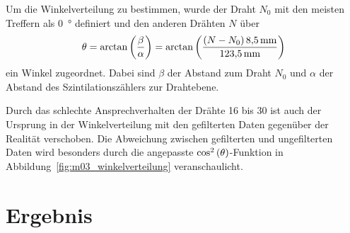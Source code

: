 \documentclass[11pt, ngerman, fleqn, DIV=15, headinclude, BCOR=2cm]{scrreprt}
\begin{document}
Um die Winkelverteilung zu bestimmen, wurde der Draht $N_0$ mit den meisten Treffern
als \SI{0}{\degree} definiert und den anderen Drähten $N$ über
\begin{equation}
	\theta = \arctan{\del{\frac{\beta}{\alpha}}} = \arctan{\del{\frac{\del{N - N_0}
	\SI{8.5}{\milli\metre}}{\SI{123.5}{\milli\metre}}}}
\end{equation}
ein Winkel zugeordnet. Dabei sind $\beta$ der Abstand zum Draht $N_0$ und
$\alpha$ der Abstand des Szintilationszählers zur Drahtebene.

Durch das schlechte Ansprechverhalten der Drähte 16 bis 30 ist auch der
Ursprung in der Winkelverteilung mit den gefilterten Daten gegenüber der
Realität verschoben. Die Abweichung zwischen gefilterten und ungefilterten
Daten wird besonders durch die angepasste $\cos^2\del{\theta}$-Funktion in
Abbildung~\ref{fig:m03_winkelverteilung} veranschaulicht.



\chapter{Ergebnis}



\end{document}
